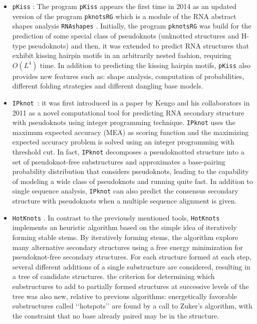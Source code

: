 \begin{itemize}
	\item \texttt{pKiss} \cite{jangie2015}: The program \texttt{pKiss} appears the first time in 2014 as an updated version of the program \texttt{pknotsRG}\cite{reeder2007pknotsrg} which is a module of the RNA abstract shapes analysis  \texttt{RNAshapes} \cite{jangie2015}. Initially, the program \texttt{pknotsRG} was build for the prediction of some special class of pseudoknots (unknotted structures and H-type pseudoknots) and then, it was extended to predict RNA structures that exhibit kissing hairpin motifs in an arbitrarily nested fashion, requiring $O(L^4)$ time.  In addition to predicting the kissing hairpin motifs, \texttt{pKiss} also provides new features such as: shape analysis, computation of probabilities, different folding strategies
	and different dangling base models. 
	\item \texttt{IPknot \cite{sato2011ipknot}}: it was first introduced in a paper by Kengo and his collaborators in 2011 as a novel computational tool for predicting RNA secondary structure with pseudoknots using integer programming technique. \texttt{IPknot} uses the maximum expected accuracy (MEA) as scoring function and the maximizing expected accuracy problem is solved using an integer programming with threshold cut. In fact, \texttt{IPknot} decomposes a pseudoknotted  structure into a set of pseudoknot-free substructures and approximates a base-pairing probability distribution that considers pseudoknots, leading to the capability of modeling a wide class of pseudoknots and running quite fast. In addition to single sequence analysis, \texttt{IPknot} can also predict the consensus secondary structure with pseudoknots when a multiple sequence alignment is given.
	\item \texttt{HotKnots} \cite{ren2005hotknots}. In contrast to the previously mentioned tools, \texttt{HotKnots} implements an heuristic algorithm based on the simple idea of iteratively forming stable stems. By iteratively forming stems, the algorithm explore many alternative secondary structures using a free energy minimization for pseudoknot-free secondary structures. For each structure formed at each step, several different additions of a single substructure are considered, resulting in a tree of candidate structures. the criterion for determining which substructures to add to partially formed structures at successive levels of the tree was also new, relative to previous algorithms: energetically favorable substructures called ‘‘hotspots’’ are found by a call to Zuker’s algorithm, with the constraint that no base already paired may be in the structure.
\end{itemize}

